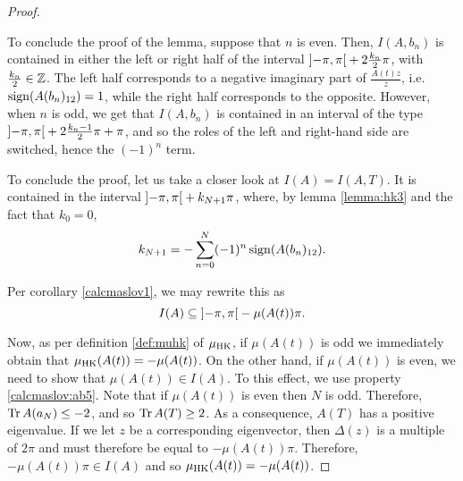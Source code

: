 \begin{proof}
\begin{lemmaproof}
To conclude the proof of the lemma, suppose that $n$ is even. Then, $I(A,b_n)$ is contained in either the left or right half of the interval $\ointerval{-\pi}\pi + 2 \frac{k_n}2 \pi$, with $\frac{k_n}2 \in \mathbb{Z}$. The left half corresponds to a negative imaginary part of $\frac{A(t) z}z$, i.e. $\operatorname{sign}(A(b_n)_{12}) = 1$, while the right half corresponds to the opposite. However, when $n$ is odd, we get that $I(A,b_n)$ is contained in an interval of the type $\ointerval{-\pi}\pi + 2 \frac{k_n - 1}2 \pi + \pi$, and so the roles of the left and right-hand side are switched, hence the $(-1)^n$ term.
\end{lemmaproof}

To conclude the proof, let us take a closer look at $I(A) = I(A,T)$. It is contained in the interval $\ointerval{-\pi}\pi + k_{N+1} \pi$, where, by lemma \ref{lemma:hk3} and the fact that $k_0 = 0$,
\begin{equation}
k_{N+1} = - \sum_{n = 0}^N (-1)^n \operatorname{sign}(A(b_n)_{12}).
\end{equation}

Per corollary \ref{calcmaslov1}, we may rewrite this as
\begin{equation}
I(A) \subseteq \ointerval{-\pi}\pi - \mu(A(t)) \pi.
\end{equation}

Now, as per definition \ref{def:muhk} of $\mu_{\mathrm{HK}}$, if $\mu(A(t))$ is odd we immediately obtain that $\mu_{\mathrm{HK}}(A(t)) = -\mu(A(t))$. On the other hand, if $\mu(A(t))$ is even, we need to show that $\mu(A(t)) \in I(A)$. To this effect, we use property \ref{calcmaslov:ab5}. Note that if $\mu(A(t))$ is even then $N$ is odd. Therefore, $\operatorname{Tr} A(a_N) \leq -2$, and so $\operatorname{Tr} A(T) \geq 2$. As a consequence, $A(T)$ has a positive eigenvalue. If we let $z$ be a corresponding eigenvector, then $\Delta(z)$ is a multiple of $2\pi$ and must therefore be equal to $-\mu(A(t)) \pi$. Therefore, $-\mu(A(t)) \pi \in I(A)$ and so $\mu_{\mathrm{HK}}(A(t)) = -\mu(A(t))$.
\end{proof}